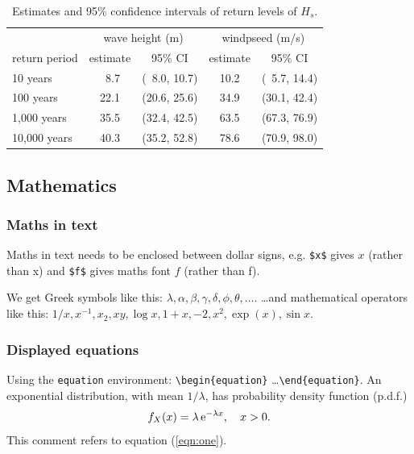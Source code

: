\documentclass[a4paper,12pt,titlepage]{article} %
\numberwithin{equation}{section}  %
\begin{document}
\renewcommand{\arraystretch}{1.1}
\begin{table}[h]
\begin{center}
\begin{tabular}{|l|cc|cc|} \hline
                     & \multicolumn{2}{c}{wave height (m)} \vline & \multicolumn{2}{c|}{windpseed (m/s)} \\
return period  & estimate & 95\% CI & estimate & 95\% CI \\ \hline
10 years    &   \,\,\,8.7          &     (\,\,\,8.0, 10.7)  & 10.2 & (\,\,\,5.7, 14.4)  \\
100 years     &   22.1          &    (20.6, 25.6)     & 34.9 & (30.1, 42.4)  \\
1,000 years    &   35.5          &    (32.4, 42.5)    & 63.5 & (67.3, 76.9)  \\
10,000 years    &    40.3         &     (35.2, 52.8)    & 78.6 & (70.9, 98.0)  \\ \hline
\end{tabular}
\caption{Estimates and 95\% confidence intervals of return levels of $H_s$.}
\label{tab:more_complicated}
\end{center}
\end{table}
\renewcommand{\arraystretch}{1}

\subsection{Mathematics}
\label{sec:maths}
\subsubsection*{Maths in text} %
Maths in text needs to be enclosed between dollar signs, e.g. \verb!$x$! gives $x$ (rather than x) and \verb!$f$! gives maths font $f$ (rather than f).

We get Greek symbols like this: $\lambda,\alpha,\beta,\gamma,\delta,\phi,\theta,\ldots$.
\ldots and mathematical operators like this: $1/x, x^{-1}, x_2,xy, \log x, 1+x, -2,x^2, \exp(x), \sin x$.

\subsubsection*{Displayed equations}

\newcommand{\e}{ {\rm e} } %

Using the \verb!equation! environment: \verb!\begin{equation}! \ldots \verb!\end{equation}!.
An exponential distribution, with mean $1/\lambda$, has probability density function (p.d.f.)
\begin{equation}
f_X(x) = \lambda \, \e^{-\lambda x}, \quad x > 0.  %
\label{eqn:one} %
\end{equation}
This comment refers to equation (\ref{eqn:one}).
\end{document}

